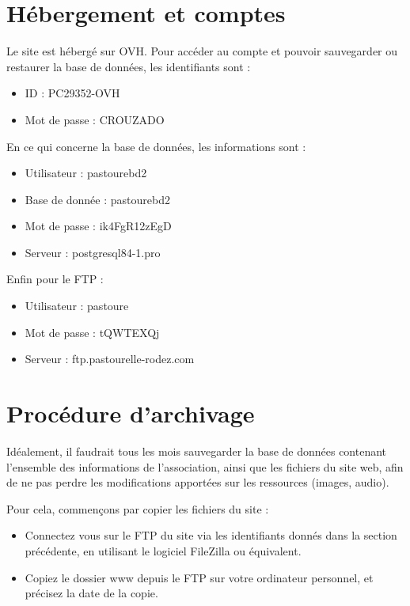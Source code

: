\documentclass[11pt]{report}
\begin{document}
\section{Hébergement et comptes}
Le site est hébergé sur OVH. Pour accéder au compte et pouvoir sauvegarder ou
restaurer la base de données, les identifiants sont : \\
\begin{itemize}
  \item ID : PC29352-OVH
  \item Mot de passe : CROUZADO \\
\end{itemize}

\par En ce qui concerne la base de données, les informations sont : \\
\begin{itemize}
  \item Utilisateur : pastourebd2
  \item Base de donnée : pastourebd2
  \item Mot de passe :  ik4FgR12zEgD
  \item Serveur : postgresql84-1.pro \\
\end{itemize}

\par Enfin pour le FTP : \\
\begin{itemize}
  \item Utilisateur : pastoure
  \item Mot de passe :  tQWTEXQj
  \item Serveur : ftp.pastourelle-rodez.com
\end{itemize}


\section{Procédure d'archivage}
Idéalement, il faudrait tous les mois sauvegarder la base de données contenant
l'ensemble des informations de l'association, ainsi que les fichiers du site
web, afin de ne pas perdre les modifications apportées sur les ressources
(images, audio).

Pour cela, commençons par copier les fichiers du site  : 
\begin{itemize}
  \item Connectez vous sur le FTP du site via les identifiants donnés dans la
  section précédente, en utilisant le logiciel FileZilla ou équivalent.
  \item Copiez le dossier \og www \fg{} depuis le FTP sur votre ordinateur
  personnel, et précisez la date de la copie. \\
\end{itemize}
\end{document}
